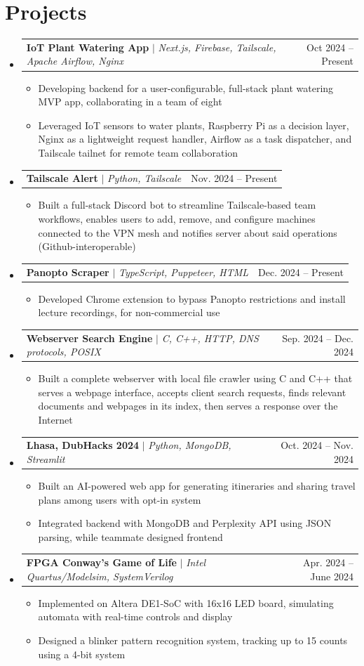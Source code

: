 \documentclass[letterpaper,11pt]{article}
\makeatletter
\newcommand{\resumeItem}[1]{
  \item\small{
    {#1 \vspace{-2pt}}
  }
}
\newcommand{\resumeProjectHeading}[2]{
    \item
    \begin{tabular*}{0.97\textwidth}{l@{\extracolsep{\fill}}r}
      \small#1 & #2 \\
    \end{tabular*}\vspace{-7pt}
}
\newcommand{\resumeSubHeadingListStart}{\begin{itemize}[leftmargin=0.15in, label={}]}
\newcommand{\resumeSubHeadingListEnd}{\end{itemize}}
\newcommand{\resumeItemListStart}{\begin{itemize}}
\newcommand{\resumeItemListEnd}{\end{itemize}\vspace{-5pt}}
\makeatother
\begin{document}
\section{Projects}
    \resumeSubHeadingListStart
      \resumeProjectHeading
          {\textbf{IoT Plant Watering App} $|$ \emph{Next.js, Firebase, Tailscale, Apache Airflow, Nginx}}{Oct 2024 -- Present}
          \resumeItemListStart
            \resumeItem{Developing backend for a user-configurable, full-stack plant watering MVP app, collaborating in a team of eight}
            \resumeItem{Leveraged IoT sensors to water plants, Raspberry Pi as a decision layer, Nginx as a lightweight request handler, Airflow as a task dispatcher, and Tailscale tailnet for remote team collaboration}
          \resumeItemListEnd
      \resumeProjectHeading
          {\textbf{Tailscale Alert} $|$ \emph{Python, Tailscale}}{Nov. 2024 -- Present}
          \resumeItemListStart
            \resumeItem{Built a full-stack Discord bot to streamline Tailscale-based team workflows, enables users to add, remove, and configure machines connected to the VPN mesh and notifies server about said operations (Github-interoperable)}
          \resumeItemListEnd
      \resumeProjectHeading
          {\textbf{Panopto Scraper} $|$ \emph{TypeScript, Puppeteer, HTML}}{Dec. 2024 -- Present}
          \resumeItemListStart
            \resumeItem{Developed Chrome extension to bypass Panopto restrictions and install lecture recordings, for non-commercial use}
          \resumeItemListEnd
      \resumeProjectHeading
          {\textbf{Webserver Search Engine} $|$ \emph{C, C++, HTTP, DNS protocols, POSIX}}{Sep. 2024 -- Dec. 2024}
          \resumeItemListStart
            \resumeItem{Built a complete webserver with local file crawler using C and C++ that serves a webpage interface, accepts client search requests, finds relevant documents and webpages in its index, then serves a response over the Internet}
          \resumeItemListEnd
      \resumeProjectHeading
          {\textbf{Lhasa, DubHacks 2024} $|$ \emph{Python, MongoDB, Streamlit}}{Oct. 2024 -- Nov. 2024}
          \resumeItemListStart
            \resumeItem{Built an AI-powered web app for generating itineraries and sharing travel plans among users with opt-in system}
            \resumeItem{Integrated backend with MongoDB and Perplexity API using JSON parsing, while teammate designed frontend}
          \resumeItemListEnd
      \resumeProjectHeading
          {\textbf{FPGA Conway's Game of Life} $|$ \emph{Intel Quartus/Modelsim, SystemVerilog}}{Apr. 2024 -- June 2024}
          \resumeItemListStart
            \resumeItem{Implemented on Altera DE1-SoC with 16x16 LED board, simulating automata with real-time controls and display}
            \resumeItem{Designed a blinker pattern recognition system, tracking up to 15 counts using a 4-bit system}
          \resumeItemListEnd
    \resumeSubHeadingListEnd
\end{document}
